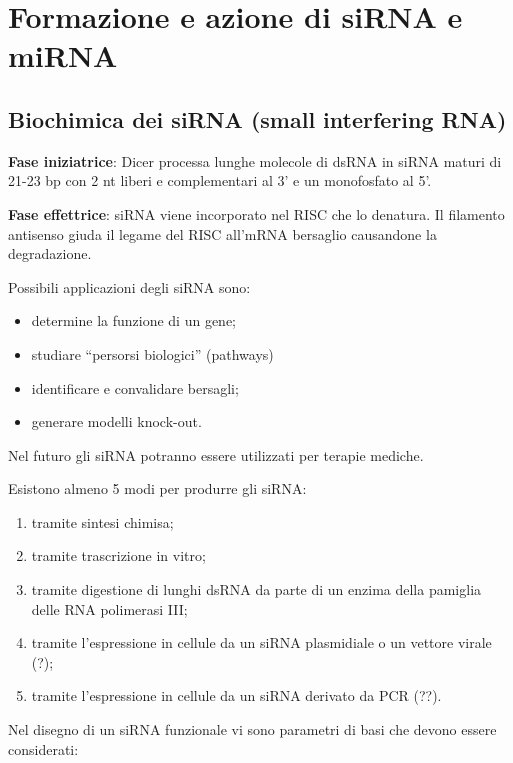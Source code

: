 \documentclass[11pt]{book}
\begin{document}
\section{Formazione e azione di siRNA e
miRNA}\label{formazione-e-azione-di-sirna-e-mirna}

\subsection{Biochimica dei siRNA (small interfering
RNA)}\label{biochimica-dei-sirna-small-interfering-rna}

\textbf{Fase iniziatrice}: Dicer processa lunghe molecole di dsRNA in
siRNA maturi di 21-23 bp con 2 nt liberi e complementari al 3' e un
monofosfato al 5'.

\textbf{Fase effettrice}: siRNA viene incorporato nel RISC che lo
denatura. Il filamento antisenso giuda il legame del RISC all'mRNA
bersaglio causandone la degradazione.

Possibili applicazioni degli siRNA sono:

\begin{itemize}
\itemsep1pt\parskip0pt
\item
  determine la funzione di un gene;
\item
  studiare ``persorsi biologici'' (pathways)
\item
  identificare e convalidare bersagli;
\item
  generare modelli knock-out.
\end{itemize}

Nel futuro gli siRNA potranno essere utilizzati per terapie mediche.

Esistono almeno 5 modi per produrre gli siRNA:

\begin{enumerate}
\def\labelenumi{\arabic{enumi}.}
\itemsep1pt\parskip0pt
\item
  tramite sintesi chimisa;
\item
  tramite trascrizione in vitro;
\item
  tramite digestione di lunghi dsRNA da parte di un enzima della
  pamiglia delle RNA polimerasi III;
\item
  tramite l'espressione in cellule da un siRNA plasmidiale o un vettore
  virale (?);
\item
  tramite l'espressione in cellule da un siRNA derivato da PCR (??).
\end{enumerate}

Nel disegno di un siRNA funzionale vi sono parametri di basi che devono
essere considerati:
\end{document}
